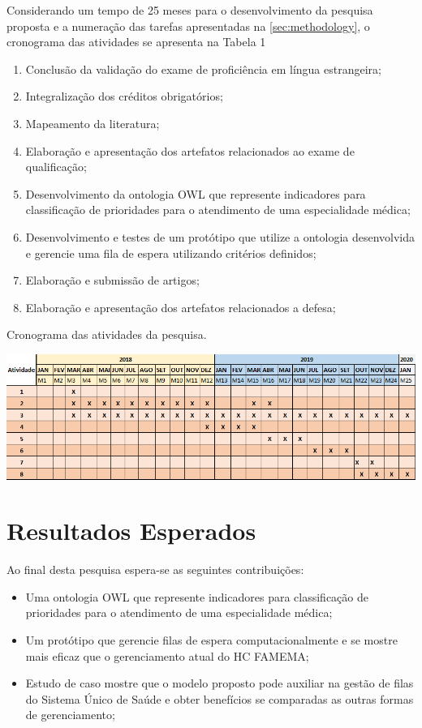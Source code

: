 	Considerando um tempo de 25 meses para o desenvolvimento da pesquisa proposta e a numeração das tarefas apresentadas na \autoref{sec:methodology}, o cronograma das atividades se apresenta na Tabela 1 %
	
	  \begin{enumerate}
    	\item Conclusão da validação do exame de proficiência em língua estrangeira;
        \item Integralização dos créditos obrigatórios;
        \item Mapeamento da literatura;
        \item Elaboração e apresentação dos artefatos relacionados ao exame de qualificação;
         \item Desenvolvimento da ontologia OWL que represente indicadores para classificação de prioridades para o atendimento de uma especialidade médica;
        \item Desenvolvimento e testes de um protótipo que utilize a ontologia desenvolvida e gerencie uma fila de espera utilizando critérios definidos;
        \item Elaboração e submissão de artigos;
        \item Elaboração e apresentação dos artefatos relacionados a defesa;
    \end{enumerate}
    
    \begin{table}[htbp]
    	\centering
        \caption{Cronograma das atividades da pesquisa.}
        \label{tab:cronogram}
        \includegraphics[width=1\linewidth]{images/cronogram}
        \fautor
    \end{table}
    
    \pagebreak
    
   \section{ Resultados Esperados}

	Ao final desta pesquisa espera-se as seguintes contribuições:
	
	\begin{itemize}
		\item Uma ontologia OWL que represente indicadores para classificação de prioridades para o atendimento de uma especialidade médica;
        \item  Um protótipo que gerencie filas de espera computacionalmente e se mostre  mais eficaz que o gerenciamento atual do HC FAMEMA;
        \item Estudo de caso mostre que o modelo proposto pode auxiliar na gestão de filas do Sistema Único de Saúde e obter benefícios se comparadas as outras formas de gerenciamento;
	\end{itemize}
